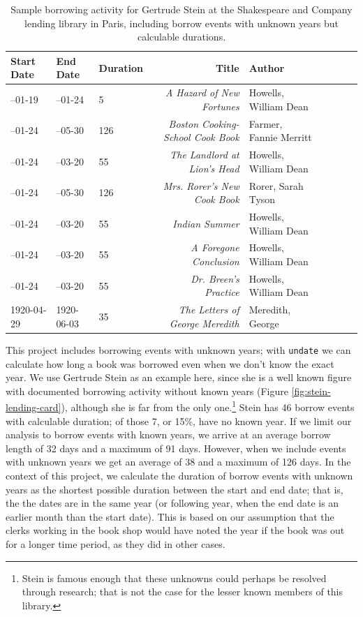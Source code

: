 \documentclass[final]{anthology-ch} %
\begin{document}
\begin{table}[h]
  \centering 
  \begin{tabular}{lllrllrrl}
    \toprule
    Start Date & End Date & Duration & Title & Author \\ 
    \midrule
--01-19 & --01-24 & 5 & \textit{A Hazard of New Fortunes} & Howells, William Dean \\
--01-24 & --05-30 & 126 & \textit{Boston Cooking-School Cook Book} & Farmer, Fannie Merritt \\
--01-24 & --03-20 & 55 & \textit{The Landlord at Lion's Head} & Howells, William Dean \\
--01-24 & --05-30 & 126 & \textit{Mrs. Rorer's New Cook Book} & Rorer, Sarah Tyson \\
--01-24 & --03-20 & 55 & \textit{Indian Summer} & Howells, William Dean \\
--01-24 & --03-20 & 55 & \textit{A Foregone Conclusion} & Howells, William Dean \\
--01-24 & --03-20 & 55 & \textit{Dr. Breen's Practice} & Howells, William Dean \\
1920-04-29 & 1920-06-03 & 35 & \textit{The Letters of George Meredith} & Meredith, George \\
    \bottomrule
  \end{tabular}
  \caption{Sample borrowing activity for Gertrude Stein at the Shakespeare and Company lending library in Paris, including borrow events with unknown years but calculable durations.}
  \label{tab:stein-borrowing}
\end{table}


This project includes borrowing events with unknown years; with
\texttt{undate} we can calculate how long a book was borrowed even when
we don't know the exact year. We use Gertrude Stein as an example here, since she is a well known figure with documented borrowing activity without known years (Figure \ref{fig:stein-lending-card}), although she is far from the only one.\footnote{Stein is famous enough that these unknowns could perhaps be resolved through research; that is not the case for the lesser known members of this library.} Stein has 46 borrow events with calculable duration; of those 7, or 15\%, have no known year.  If we limit our analysis to borrow events with known years, we arrive at an average borrow length of 32 days and a maximum of 91 days. However, when we include events with unknown years we get an average of 38 and a maximum of 126 days. In the context of this project, we calculate the duration of borrow events with unknown years as the shortest possible duration between the start and end date; that is, the the dates are in the same year (or following year, when the end date is an earlier month than the start date). This is based on our assumption that the clerks working in the book shop would have noted the year if the book was out for a longer time period, as they did in other cases.
\end{document}
